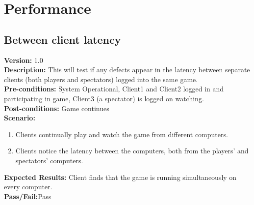 \documentclass[12pt]{article}
\begin{document}
\newpage

\section{Performance}
\label{sec:performanceCases}


    \subsection{Between client latency}
    \textbf{Version:} 1.0\\
    \textbf{Description:} This will test if any defects appear in the latency between separate clients (both players and spectators) logged into the same game.\\
    \textbf{Pre-conditions:} System Operational, Client1 and Client2 logged in and participating in game, Client3 (a spectator) is logged on watching. \\
    \textbf{Post-conditions:} Game continues\\
    \textbf{Scenario:}
    \begin{enumerate}
        \item Clients continually play and watch the game from different computers.
        \item Clients notice the latency between the computers, both from the players' and spectators' computers.
    \end{enumerate}
    \textbf{Expected Results:} Client finds that the game is running simultaneously on every computer.\\
    \textbf{Pass/Fail:}Pass\\
\end{document}
